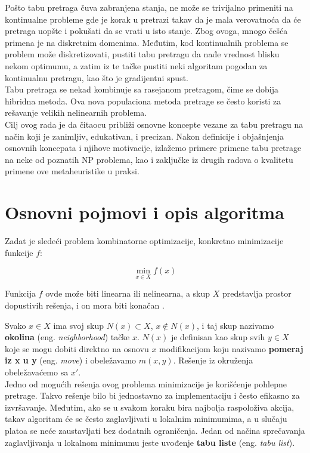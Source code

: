 \documentclass[a4paper]{article}
\begin{document}
Pošto tabu pretraga čuva zabranjena stanja, ne može se trivijalno primeniti na kontinualne probleme gde je korak u pretrazi takav da je mala verovatnoća da će pretraga uopšte i pokušati da se vrati u isto stanje. Zbog ovoga, mnogo češća primena je na diskretnim domenima. Međutim, kod kontinualnih problema se problem može diskretizovati, pustiti tabu pretragu da nađe vrednost blisku nekom optimumu, a zatim iz te tačke pustiti neki algoritam pogodan za kontinualnu pretragu, kao što je gradijentni spust. \cite{tabusearchbook}\\

Tabu pretraga se nekad kombinuje sa rasejanom pretragom, čime se dobija hibridna metoda. Ova nova populaciona metoda pretrage se često koristi za rešavanje velikih nelinearnih problema. \cite{scatter}\\

Cilj ovog rada je da čitaocu približi osnovne koncepte vezane za tabu pretragu na način koji je zanimljiv, edukativan, i precizan. Nakon definicije i objašnjenja osnovnih koncepata i njihove motivacije, izlažemo primere primene tabu pretrage na neke od poznatih NP problema, kao i zaključke iz drugih radova o kvalitetu primene ove metaheuristike u praksi.


\section{Osnovni pojmovi i opis algoritma}

Zadat je sledeći problem kombinatorne optimizacije, konkretno minimizacije funkcije $f$:

$$\min\limits_{x\in X} f(x)$$

Funkcija $f$ ovde može biti linearna ili nelinearna, a skup $X$ predstavlja prostor dopustivih rešenja, i on mora biti konačan \cite{yugobrief}.

Svako $x\in X$ ima svoj skup $N(x)\subset X$, $x\notin N(x)$, i taj skup nazivamo \textbf{okolina} (eng. \textit{neighborhood}) tačke $x$. $N(x)$ je definisan kao skup svih $y\in X$ koje se mogu dobiti direktno na osnovu $x$ modifikacijom koju nazivamo \textbf{pomeraj iz x u y} (eng. \textit{move}) i obeležavamo $m(x,y)$. Rešenje iz okruženja obeležavaćemo sa $x'$. \cite{yugobrief}\\

Jedno od mogućih rešenja ovog problema minimizacije je korišćenje pohlepne pretrage. \cite{vi} Takvo rešenje bilo bi jednostavno za implementaciju i često efikasno za izvršavanje. Međutim, ako se u svakom koraku bira najbolja raspoloživa akcija, takav algoritam će se često zaglavljivati u lokalnim minimumima, a u slučaju platoa se neće zaustavljati bez dodatnih ograničenja. Jedan od načina sprečavanja zaglavljivanja u lokalnom minimumu jeste uvođenje \textbf{tabu liste} (eng. \textit{tabu list}).
\end{document}
